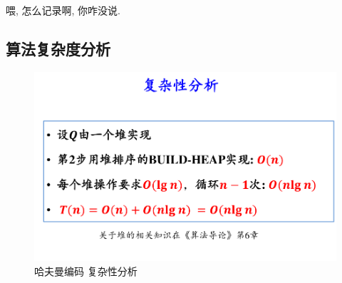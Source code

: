 \documentclass[a4paper, 10pt]{ctexart} %
\begin{document}
喂, 怎么记录啊, 你咋没说.
\subsection{算法复杂度分析}
\begin{figure}[H]
    \centering
    \includegraphics[scale= 0.5]{2.png}   
    \caption[]{哈夫曼编码 复杂性分析}
\end{figure}
\end{document}

